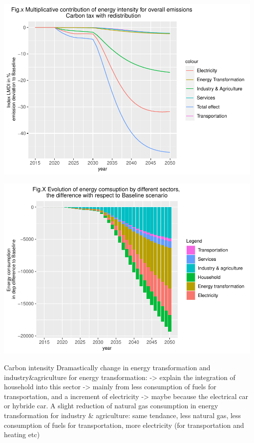 \documentclass[
]{article}
\begin{document}
\includegraphics{Modele-ThreeMe-Tunisie_Sequeira_Valilou_Wang_files/figure-latex/unnamed-chunk-19-1.pdf}

\includegraphics{Modele-ThreeMe-Tunisie_Sequeira_Valilou_Wang_files/figure-latex/unnamed-chunk-20-1.pdf}

Carbon intensity Dramastically change in energy transformation and
industry\&agriculture for energy transformation: -\textgreater{} explain
the integration of household into this sector -\textgreater{} mainly
from less consumption of fuels for transportation, and a increment of
electricity -\textgreater{} maybe because the electrical car or hybride
car. A slight reduction of natural gas consumption in energy
transformation for industry \& agriculture: same tendance, less natural
gas, less consumption of fuels for transportation, more electricity (for
transportation and heating etc)
\end{document}
